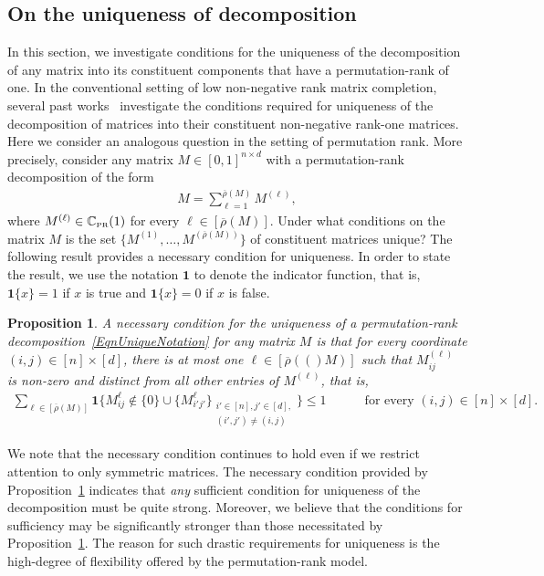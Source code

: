 \documentclass[11pt, hidelinks]{article} %
\newtheorem{proposition}{Proposition}
\newcommand{\indicator}[1]{\ensuremath{\mathbf{1}\{#1\}}}
\newcommand{\numrows}{n}
\newcommand{\numcols}{d}
\newcommand{\wtmatrix}{M}
\newcommand{\wt}{\wtmatrix}
\newcommand{\matrixset}{\mathbb{C}}
\newcommand{\permset}{\matrixset_{\mbox{\tiny PR}}}
\newcommand{\permrank}{\rho}
\newcommand{\fnpermrank}[1]{\overline{\permrank}(#1)}
\begin{document}

\subsection{On the uniqueness of decomposition}

In this section, we investigate conditions for the uniqueness of the
decomposition of any matrix into its constituent components that have
a permutation-rank of one.  In the conventional setting of low
non-negative rank matrix completion, several past works~\cite{donoho2003does, theis2005first, laurberg2008theorems,
	gillis2012sparse, arora2012computing} investigate the conditions required for uniqueness of the
decomposition of matrices into their constituent non-negative rank-one
matrices.  Here we consider an
analogous question in the setting of permutation rank.  More
precisely, consider any matrix $\wt \in [0,1]^{\numrows \times
  \numcols}$ with a permutation-rank decomposition of the form
\begin{align}
\label{EqnUniqueNotation}
\wt = \sum_{\ell =1}^{\fnpermrank{\wt}} \wt^{(\ell)},
\end{align}
where $\wt^{(\ell)} \in \permset(1)$ for every $\ell \in
[\fnpermrank{\wt}]$. Under what conditions on the matrix $\wt$ is the
set $\{\wt^{(1)}, \ldots, \wt^{(\fnpermrank{\wt})} \}$ of constituent
matrices unique?  The following result provides a necessary condition
for uniqueness. In order to state the result, we use the notation $\mathbf{1}$ to denote the indicator function, that is, $\indicator{x} = 1$ if $x$ is true and $\indicator{x} = 0$ if $x$ is false.
%
\begin{proposition}
  \label{PropUniqueDecomposition}
A necessary condition for the uniqueness of a permutation-rank
decomposition~\eqref{EqnUniqueNotation} for any matrix $\wt$ is that for every coordinate
$(i,j) \in [\numrows] \times [\numcols]$, there is at most one $\ell
\in [\fnpermrank(\wt)]$ such that $\wt^{(\ell)}_{ij}$ is non-zero and
distinct from all other entries of $\wt^{(\ell)}$, that is,
\begin{align*}
	\sum_{\ell \in [\fnpermrank{\wt}] } \mathbf{1} \Big\{ \wt_{ij}^{\ell} \notin \{0\} \cup \{ \wt_{i'j'}^{\ell} \}_{\substack{i' \in [\numrows], j' \in [\numcols], \\ (i',j') \neq (i,j) }} \Big\} \leq 1 \qquad\quad \mbox{for every $(i,j) \in [\numrows] \times [\numcols]$}.
\end{align*}
\end{proposition}
\noindent We note that the necessary condition continues to hold even
if we restrict attention to only symmetric matrices. The necessary condition provided by 
Proposition~\ref{PropUniqueDecomposition} indicates that \emph{any}
sufficient condition for uniqueness of the decomposition must be quite strong. Moreover, we believe that the conditions for
sufficiency may be significantly stronger than those necessitated by
Proposition~\ref{PropUniqueDecomposition}. The reason for such drastic requirements for
uniqueness is the high-degree of flexibility offered by the
permutation-rank model.
\end{document}
